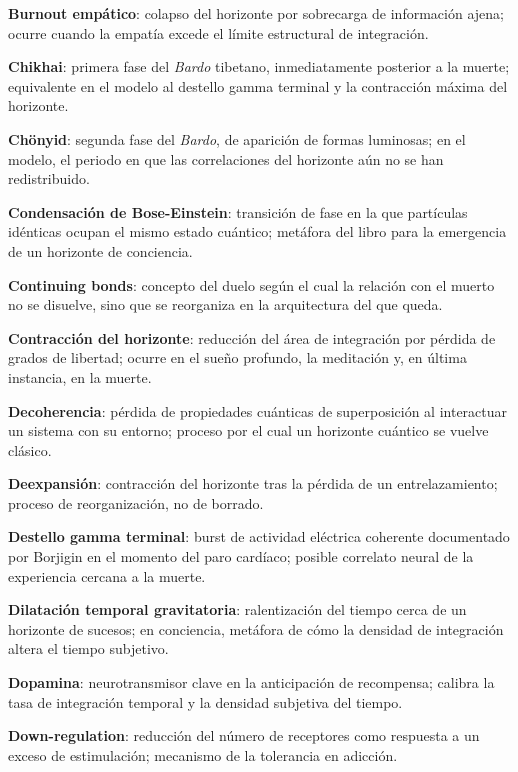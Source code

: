 \glos \textbf{Burnout empático}: colapso del horizonte por sobrecarga de información ajena; ocurre cuando la empatía excede el límite estructural de integración.

\glos \textbf{Chikhai}: primera fase del \emph{Bardo} tibetano, inmediatamente posterior a la muerte; equivalente en el modelo al destello gamma terminal y la contracción máxima del horizonte.

\glos \textbf{Chönyid}: segunda fase del \emph{Bardo}, de aparición de formas luminosas; en el modelo, el periodo en que las correlaciones del horizonte aún no se han redistribuido.

\glos \textbf{Condensación de Bose-Einstein}: transición de fase en la que partículas idénticas ocupan el mismo estado cuántico; metáfora del libro para la emergencia de un horizonte de conciencia.

\glos \textbf{Continuing bonds}: concepto del duelo según el cual la relación con el muerto no se disuelve, sino que se reorganiza en la arquitectura del que queda.

\glos \textbf{Contracción del horizonte}: reducción del área de integración por pérdida de grados de libertad; ocurre en el sueño profundo, la meditación y, en última instancia, en la muerte.

\glos \textbf{Decoherencia}: pérdida de propiedades cuánticas de superposición al interactuar un sistema con su entorno; proceso por el cual un horizonte cuántico se vuelve clásico.

\glos \textbf{Deexpansión}: contracción del horizonte tras la pérdida de un entrelazamiento; proceso de reorganización, no de borrado.

\glos \textbf{Destello gamma terminal}: burst de actividad eléctrica coherente documentado por Borjigin en el momento del paro cardíaco; posible correlato neural de la experiencia cercana a la muerte.

\glos \textbf{Dilatación temporal gravitatoria}: ralentización del tiempo cerca de un horizonte de sucesos; en conciencia, metáfora de cómo la densidad de integración altera el tiempo subjetivo.

\glos \textbf{Dopamina}: neurotransmisor clave en la anticipación de recompensa; calibra la tasa de integración temporal y la densidad subjetiva del tiempo.

\glos \textbf{Down-regulation}: reducción del número de receptores como respuesta a un exceso de estimulación; mecanismo de la tolerancia en adicción.

